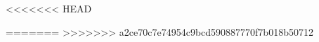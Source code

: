 \documentclass[twoside,doctor,hide]{DUT-thesis-grd}
\begin{document}







\frontmatter

%

%





%

\mainmatter

\let\cleardoublepage\clearpage

<<<<<<< HEAD





=======
%
%
%
%
%
%
>>>>>>> a2ce70c7e74954c9bcd590887770f7b018b50712

%
%
%
%
%
%



\end{document}
